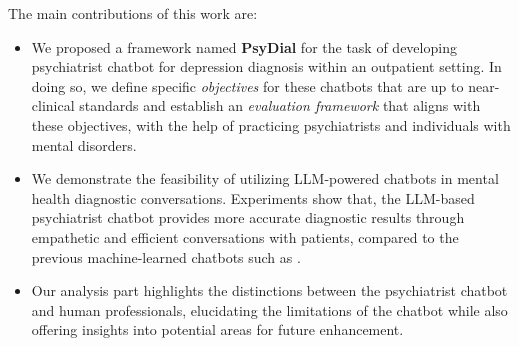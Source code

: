 The main contributions of this work are:
\begin{itemize}
    \item We proposed a framework named \textbf{PsyDial} for the task of developing psychiatrist chatbot for depression diagnosis within an outpatient setting. In doing so, we define specific \textit{objectives} for these chatbots that are up to near-clinical standards and establish an \textit{evaluation framework} that aligns with these objectives, with the help of practicing psychiatrists and individuals with mental disorders.
    \item We demonstrate the feasibility of utilizing LLM-powered chatbots in mental health diagnostic conversations. Experiments show that, the LLM-based psychiatrist chatbot provides more accurate diagnostic results through empathetic and efficient conversations with patients, compared to the previous machine-learned chatbots such as \citet{yao-etal-2022-d4}.
    \item Our analysis part highlights the distinctions between the psychiatrist chatbot and human professionals, elucidating the limitations of the chatbot while also offering insights into potential areas for future enhancement.
\end{itemize}

